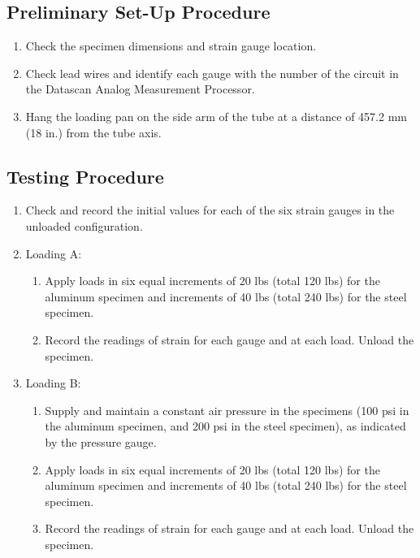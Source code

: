\documentclass[12pt, titlepage]{article}
\begin{document}
\subsection{Preliminary Set-Up Procedure}
\begin{enumerate}
    \item Check the specimen dimensions and strain gauge location.
    \item Check lead wires and identify each gauge with the number of the
      circuit in the Datascan Analog Measurement Processor.
    \item Hang the loading pan on the side arm of the tube at a distance of
      457.2 mm (18 in.) from the tube axis.
\end{enumerate}

\subsection{Testing Procedure}
\begin{enumerate}
    \item Check and record the initial values for each of the six strain gauges
      in the unloaded configuration.
    \item Loading A:
    \begin{enumerate}
        \item Apply loads in six equal increments of 20 lbs (total 120 lbs) for
          the aluminum specimen and increments of 40 lbs (total 240 lbs) for
          the steel specimen.
        \item Record the readings of strain for each gauge and at each load.
          Unload the specimen.
    \end{enumerate}
    \item Loading B:
    \begin{enumerate}
        \item Supply and maintain a constant air pressure in the specimens (100
          psi in the aluminum specimen, and 200 psi in the steel specimen), as
          indicated by the pressure gauge.
        \item Apply loads in six equal increments of 20 lbs (total 120 lbs) for
          the aluminum specimen and increments of 40 lbs (total 240 lbs) for
          the steel specimen.
        \item Record the readings of strain for each gauge and at each load.
          Unload the specimen.
    \end{enumerate}
\end{enumerate}
\newpage
\end{document}
